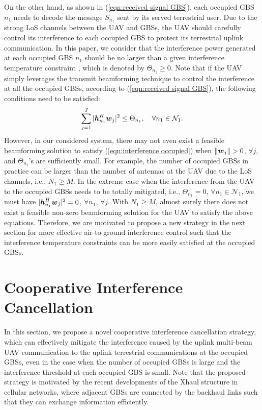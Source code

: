 \documentclass[onecolumn, draftclsnofoot, 12pt]{IEEEtran}
\newcommand{\mv}[1]{\mbox{\boldmath{$ #1 $}}}
\begin{document}
On the other hand, as shown in (\ref{eqn:received signal GBS}), each occupied GBS $n_1$ needs to decode the message $S_{n_1}$ sent by its served terrestrial user. Due to the strong LoS channels between the UAV and GBSs, the UAV should carefully control its interference to each occupied GBS to protect its terrestrial uplink communication. In this paper, we consider that the interference power generated at each occupied GBS $n_1$ should be no larger than a given interference temperature constraint \cite{Interference_Temperature}, which is denoted by $\Theta_{n_1}\geq 0$. Note that if the UAV simply leverages the transmit beamforming technique to control the interference at all the occupied GBSs, according to (\ref{eqn:received signal GBS}), the following conditions need to be satisfied:
\begin{equation}\label{eqn:interference occupied}
\sum\limits_{j=1}^J|\mv{h}_{n_1}^H\mv{w}_j|^2\leq \Theta_{n_1}, ~~~ \forall n_1\in \mathcal{N}_1.
\end{equation}
However, in our considered system, there may not even exist a feasible beamforming solution to satisfy (\ref{eqn:interference occupied}) when $\|\mv{w}_j\|>0$, $\forall j$, and $\Theta_{n_1}$'s are sufficiently small. For example, the number of occupied GBSs in practice can be larger than the number of antennas at the UAV due to the LoS channels, i.e., $N_1\geq M$. In the extreme case when the interference from the UAV to the occupied GBSs needs to be totally mitigated, i.e., $\Theta_{n_1}=0$, $\forall n_1\in \mathcal{N}_1$, we must have $|\mv{h}_{n_1}^H\mv{w}_j|^2=0$, $\forall n_1$, $\forall j$. With $N_1\geq M$, almost surely there does not exist a feasible non-zero beamforming solution for the UAV to satisfy the above equations. Therefore, we are motivated to propose a new strategy in the next section for more effective air-to-ground interference control such that the interference temperature constraints can be more easily satisfied at the occupied GBSs.


\section{Cooperative Interference Cancellation}\label{sec:Cooperative Interference Cancellation}

In this section, we propose a novel cooperative interference cancellation strategy, which can effectively mitigate the interference caused by the uplink multi-beam UAV communication to the uplink terrestrial communications at the occupied GBSs, even in the case when the number of occupied GBSs is large and the interference threshold at each occupied GBS is small. Note that the proposed strategy is motivated by the recent developments of the Xhaul structure \cite{Xhaul} in cellular networks, where adjacent GBSs are connected by the backhaul links such that they can exchange information efficiently.
\end{document}
